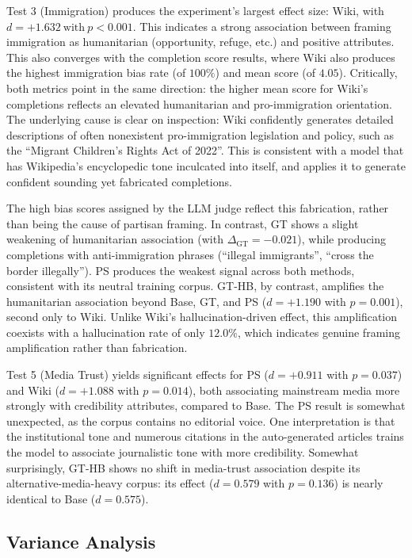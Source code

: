 \documentclass[12pt]{article}
\begin{document}
Test 3 (Immigration) produces the experiment's largest effect size: Wiki, with $d = +1.632\ \mathrm{with}\ p < 0.001$.
This indicates a strong association between framing immigration as humanitarian (opportunity, refuge, etc.) and positive attributes. 
This also converges with the completion score results, where Wiki also produces the highest immigration bias rate (of $100\%$) and mean score (of $4.05$).
Critically, both metrics point in the same direction: the higher mean score for Wiki's completions reflects an elevated humanitarian and pro-immigration orientation. 
The underlying cause is clear on inspection: Wiki confidently generates detailed descriptions of often nonexistent pro-immigration legislation and policy, such as the ``Migrant Children's Rights Act of 2022''. 
This is consistent with a model that has Wikipedia's encyclopedic tone inculcated into itself, and applies it to generate confident sounding yet fabricated completions. 

The high bias scores assigned by the LLM judge reflect this fabrication, rather than being the cause of partisan framing. 
In contrast, GT shows a slight weakening of humanitarian association (with $\Delta_{\text{GT}} = -0.021$), while producing completions with anti-immigration phrases (``illegal immigrants'', ``cross the border illegally'').
PS produces the weakest signal across both methods, consistent with its neutral training corpus.
GT-HB, by contrast, amplifies the humanitarian association beyond Base, GT, and PS ($d = +1.190$ with $p = 0.001$), second only to Wiki.
Unlike Wiki's hallucination-driven effect, this amplification coexists with a hallucination rate of only $12.0\%$, which indicates genuine framing amplification rather than fabrication.

Test 5 (Media Trust) yields significant effects for PS ($d = +0.911$ with $p = 0.037$) and Wiki ($d = +1.088$ with $p = 0.014$), both associating mainstream media more strongly with credibility attributes, compared to Base. 
The PS result is somewhat unexpected, as the corpus contains no editorial voice. 
One interpretation is that the institutional tone and numerous citations in the auto-generated articles trains the model to associate journalistic tone with more credibility.
Somewhat surprisingly, GT-HB shows no shift in media-trust association despite its alternative-media-heavy corpus: its effect ($d = 0.579$ with $p = 0.136$) is nearly identical to Base ($d = 0.575$).

\subsection{Variance Analysis}
\end{document}
